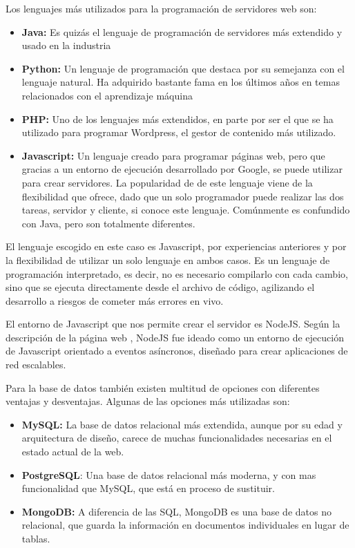 Los lenguajes más utilizados para la programación de servidores web son:
\begin{itemize}
\item \textbf{Java:} Es quizás el lenguaje de programación de servidores más extendido y usado en la industria
\item \textbf{Python:} Un lenguaje de programación que destaca por su semejanza con el lenguaje natural. Ha adquirido bastante fama en los últimos años en temas relacionados con el aprendizaje máquina
\item \textbf{PHP:} Uno de los lenguajes más extendidos, en parte por ser el que se ha utilizado para programar Wordpress, el gestor de contenido más utilizado.
\item \textbf{Javascript:} Un lenguaje creado para programar páginas web, pero que gracias a un entorno de ejecución desarrollado por Google, se puede utilizar para crear servidores. La popularidad de de este lenguaje viene de la flexibilidad que ofrece, dado que un solo programador puede realizar las dos tareas, servidor y cliente, si conoce este lenguaje. Comúnmente es confundido con Java, pero son totalmente diferentes.
\end{itemize}

El lenguaje escogido en este caso es Javascript, por experiencias anteriores y por la flexibilidad de utilizar un solo lenguaje en ambos casos. Es un lenguaje de programación interpretado, es decir, no es necesario compilarlo con cada cambio, sino que se ejecuta directamente desde el archivo de código, agilizando el desarrollo a riesgos de cometer más errores en vivo. 

El entorno de Javascript que nos permite crear el servidor es NodeJS. Según la descripción de la página web \cite{node_website}, NodeJS fue ideado como un entorno de ejecución de Javascript orientado a eventos asíncronos, diseñado para crear aplicaciones de red escalables.

Para la base de datos también existen multitud de opciones con diferentes ventajas y desventajas. Algunas de las opciones más utilizadas son:
\begin{itemize}
\item \textbf{MySQL:} La base de datos relacional más extendida, aunque por su edad y arquitectura de diseño, carece de muchas funcionalidades necesarias en el estado actual de la web.
\item \textbf{PostgreSQL}: Una base de datos relacional más moderna, y con mas funcionalidad que MySQL, que está en proceso de sustituir.
\item \textbf{MongoDB:} A diferencia de las SQL, MongoDB es una base de datos no relacional, que guarda la información en documentos individuales en lugar de tablas.
\end{itemize}

